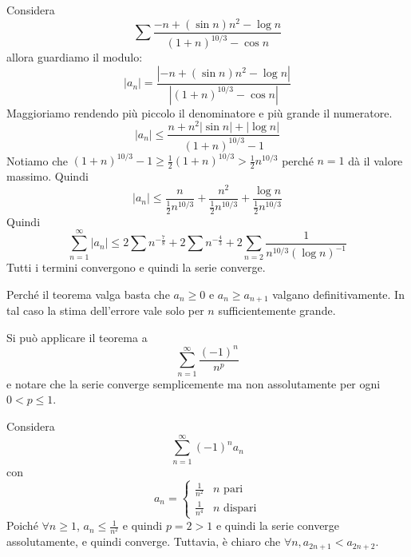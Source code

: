 \documentclass[a4paper]{article}
\begin{document}
\begin{snippetexample}{}
    Considera
    \[
        \sum \frac{
            -n + {(\sin n)}n^2 - \log n
        }{
            {(1+n)}^{10/3} - \cos n
        }
    \]
    allora guardiamo il modulo:
    \[
        |a_n| = \frac{
            |-n + (\sin n)n^2 - \log n|
        }{
            |{(1+n)}^{10/3} - \cos n|
        }
    \]
    Maggioriamo rendendo più piccolo il denominatore e più grande il numeratore.
    \[
        |a_n| \leq \frac{
            n + n^2|\sin n| + |\log n|
        }{
            {(1+n)}^{10/3} -1
        }
    \]
    Notiamo che \({(1+n)}^{10/3} - 1 \geq \frac{1}{2}{(1+n)}^{10/3} > \frac{1}{2}n^{10/3}\)
    perché \(n=1\) dà il valore massimo. Quindi
    \[
        |a_n| \leq \frac{
           n
        }{
            \frac{1}{2}n^{10/3}         
        }
        + \frac{n^2}{\frac{1}{2}n^{10/3}}
        + \frac{\log n}{\frac{1}{2}n^{10/3}}
    \]
    Quindi
    \[
        \sum_{n=1}^\infty |a_n| \leq
        2 \sum n^{-\frac{7}{8}}
        +
        2 \sum n^{-\frac{4}{3}}
        + 2 \sum_{n=2} \frac{1}{n^{10/3} {(\log n)}^{-1}}
    \]
    Tutti i termini convergono e quindi la serie converge.
\end{snippetexample}

Perché il teorema valga basta che \(a_n \geq 0\) e \(a_n \geq a_{n+1}\)
valgano definitivamente.
In tal caso la stima dell'errore vale solo per \(n\) sufficientemente grande.

\begin{snippetexample}{}
    Si può applicare il teorema a
    \[
        \sum_{n=1}^\infty \frac{{(-1)}^n}{n^p}
    \]
    e notare che la serie converge semplicemente ma non assolutamente per ogni \(0 < p \leq 1\).
\end{snippetexample}

\pagebreak

\begin{snippetexample}{}
    Considera
    \[
        \sum_{n=1}^\infty {(-1)}^n a_n
    \]
    con
    \[
        a_n = \begin{cases}
            \frac{1}{n^2} & n \text{ pari} \\
            \frac{1}{n^4} & n \text{ dispari}
        \end{cases}
    \]
    Poiché \(\forall n \geq 1\), \(a_n \leq \frac{1}{n^2}\) e quindi \(p = 2 > 1\) e quindi la serie converge assolutamente,
    e quindi converge. Tuttavia, è chiaro che \(\forall n, a_{2n+1} < a_{2n+2}\).
\end{snippetexample}
\end{document}
